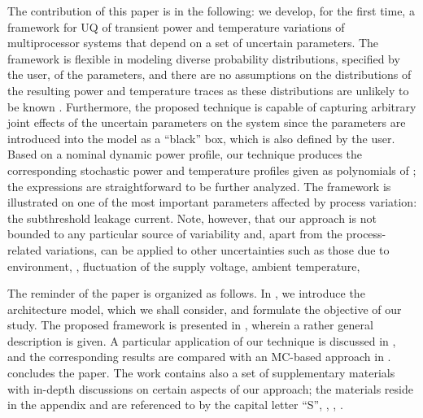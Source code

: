 The contribution of this paper is in the following: we develop, for the first time, a framework for UQ of transient power and temperature variations of multiprocessor systems that depend on a set of uncertain parameters. The framework is flexible in modeling diverse probability distributions, specified by the user, of the parameters, and there are no assumptions on the distributions of the resulting power and temperature traces as these distributions are unlikely to be known \apriori. Furthermore, the proposed technique is capable of capturing arbitrary joint effects of the uncertain parameters on the system since the parameters are introduced into the model as a ``black'' box, which is also defined by the user. Based on a nominal dynamic power profile, our technique produces the corresponding stochastic power and temperature profiles given as polynomials of \rvs; the expressions are straightforward to be further analyzed. The framework is illustrated on one of the most important parameters affected by process variation: the subthreshold leakage current. Note, however, that our approach is not bounded to any particular source of variability and, apart from the process-related variations, can be applied to other uncertainties such as those due to environment, \ie, fluctuation of the supply voltage, ambient temperature, \etc


The reminder of the paper is organized as follows. In , we introduce the architecture model, which we shall consider, and formulate the objective of our study. The proposed framework is presented in , wherein a rather general description is given. A particular application of our technique is discussed in , and the corresponding results are compared with an MC-based approach in .  concludes the paper. The work contains also a set of supplementary materials with in-depth discussions on certain aspects of our approach; the materials reside in the appendix and are referenced to by the capital letter ``S'', \eg, , .
